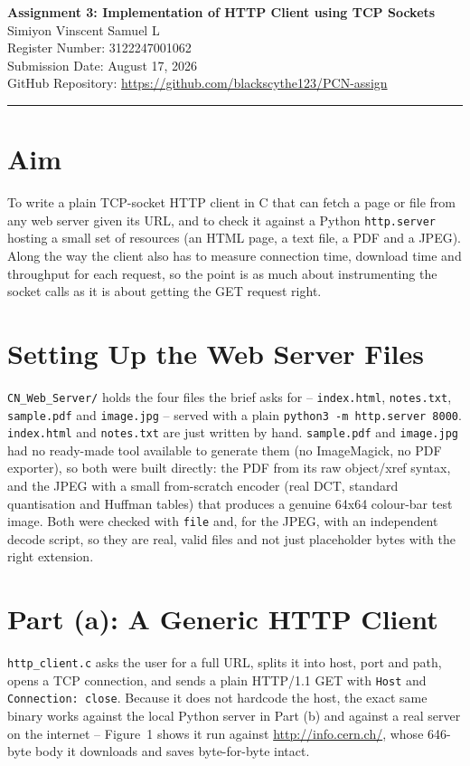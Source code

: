 \documentclass[11pt,a4paper]{article}
\begin{document}
\begin{center}
{\LARGE \textbf{Assignment 3: Implementation of HTTP Client using TCP Sockets}}\\[4mm]
Simiyon Vinscent Samuel L\\
Register Number: 3122247001062\\
Submission Date: August 17, 2026\\
GitHub Repository: \url{https://github.com/blackscythe123/PCN-assign}
\end{center}

\vspace{2mm}
\hrule
\vspace{4mm}

\section*{Aim}
To write a plain TCP-socket HTTP client in C that can fetch a page or file from any
web server given its URL, and to check it against a Python \texttt{http.server}
hosting a small set of resources (an HTML page, a text file, a PDF and a JPEG). Along
the way the client also has to measure connection time, download time and throughput
for each request, so the point is as much about instrumenting the socket calls as it
is about getting the GET request right.

\section*{Setting Up the Web Server Files}
\texttt{CN\_Web\_Server/} holds the four files the brief asks for --
\texttt{index.html}, \texttt{notes.txt}, \texttt{sample.pdf} and \texttt{image.jpg} --
served with a plain \texttt{python3 -m http.server 8000}. \texttt{index.html} and
\texttt{notes.txt} are just written by hand. \texttt{sample.pdf} and \texttt{image.jpg}
had no ready-made tool available to generate them (no ImageMagick, no PDF exporter), so
both were built directly: the PDF from its raw object/xref syntax, and the JPEG with a
small from-scratch encoder (real DCT, standard quantisation and Huffman tables) that
produces a genuine 64x64 colour-bar test image. Both were checked with \texttt{file}
and, for the JPEG, with an independent decode script, so they are real, valid files and
not just placeholder bytes with the right extension.

\section*{Part (a): A Generic HTTP Client}
\texttt{http\_client.c} asks the user for a full URL, splits it into host, port and
path, opens a TCP connection, and sends a plain HTTP/1.1 GET with \texttt{Host} and
\texttt{Connection: close}. Because it does not hardcode the host, the exact same
binary works against the local Python server in Part (b) and against a real server on
the internet -- Figure~1 shows it run against \url{http://info.cern.ch/}, whose
646-byte body it downloads and saves byte-for-byte intact.
\end{document}
